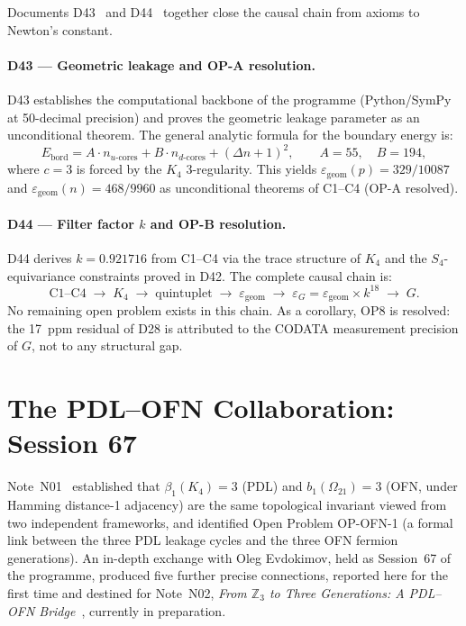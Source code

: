 \documentclass[11pt,a4paper]{article}
\theoremstyle{plain}
\theoremstyle{definition}
\theoremstyle{remark}
\newcommand{\Kfour}{K_4}
\begin{document}
Documents D43~\cite{D43} and D44~\cite{D44} together close the causal chain from axioms to Newton's constant.

\paragraph{D43 --- Geometric leakage and OP-A resolution.} D43 establishes the computational backbone of the programme (Python/SymPy at 50-decimal precision) and proves the geometric leakage parameter as an unconditional theorem. The general analytic formula for the boundary energy is:
\begin{equation}
E_{\mathrm{bord}} = A \cdot n_{u\text{-cores}} + B \cdot n_{d\text{-cores}} + (\Delta n+1)^2, \qquad A = 55,\quad B = 194,
\end{equation}
where $c=3$ is forced by the $K_4$ 3-regularity. This yields $\varepsilon_{\mathrm{geom}}(p) = 329/10087$ and $\varepsilon_{\mathrm{geom}}(n) = 468/9960$ as unconditional theorems of C1--C4 (OP-A resolved).

\paragraph{D44 --- Filter factor $k$ and OP-B resolution.} D44 derives $k = 0.921716$ from C1--C4 via the trace structure of $K_4$ and the $S_4$-equivariance constraints proved in D42. The complete causal chain is:
\begin{equation*}
\text{C1--C4} \;\to\; K_4 \;\to\; \text{quintuplet} \;\to\; \varepsilon_{\mathrm{geom}} \;\to\; \varepsilon_G = \varepsilon_{\mathrm{geom}} \times k^{18} \;\to\; G.
\end{equation*}
No remaining open problem exists in this chain. As a corollary, OP8 is resolved: the 17~ppm residual of D28 is attributed to the CODATA measurement precision of $G$, not to any structural gap.

\section{The PDL--OFN Collaboration: Session 67}
\label{sec:PDLOFN}

Note~N01~\cite{N01} established that $\beta_1(\Kfour)=3$ (PDL) and $b_1(\Omega_{21})=3$ (OFN, under Hamming distance-1 adjacency) are the same topological invariant viewed from two independent frameworks, and identified Open Problem OP-OFN-1 (a formal link between the three PDL leakage cycles and the three OFN fermion generations). An in-depth exchange with Oleg Evdokimov, held as Session~67 of the programme, produced five further precise connections, reported here for the first time and destined for Note~N02, \emph{From $\mathbb{Z}_3$ to Three Generations: A PDL--OFN Bridge}~\cite{N02}, currently in preparation.
\end{document}
